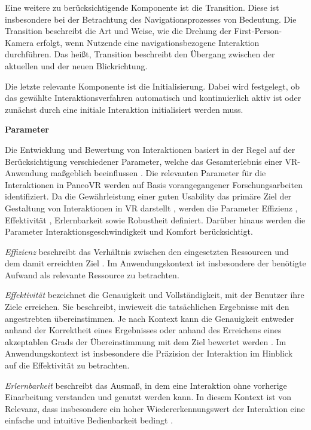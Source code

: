 Eine weitere zu berücksichtigende Komponente ist die Transition. Diese ist insbesondere bei der Betrachtung des Navigationsprozesses von Bedeutung. Die Transition beschreibt die Art und Weise, wie die Drehung der First-Person-Kamera erfolgt, wenn Nutzende eine navigationsbezogene Interaktion durchführen. Das heißt, Transition beschreibt den Übergang zwischen der aktuellen und der neuen Blickrichtung.

Die letzte relevante Komponente ist die Initialisierung. Dabei wird festgelegt, ob das gewählte Interaktionsverfahren automatisch und kontinuierlich aktiv ist oder zunächst durch eine initiale Interaktion initialisiert werden muss. 

{\normalfont \bfseries Parameter} 

Die Entwicklung und Bewertung von Interaktionen basiert in der Regel auf der Berücksichtigung verschiedener Parameter, welche das Gesamterlebnis einer VR-Anwendung maßgeblich beeinflussen \citep{10.1145/3441852.3471230}. Die relevanten Parameter für die Interaktionen in PaneoVR werden auf Basis vorangegangener Forschungsarbeiten identifiziert. Da die Gewährleistung einer guten Usability das primäre Ziel der Gestaltung von Interaktionen in VR darstellt \citep{dorner_virtual_2019}, werden die Parameter Effizienz \citep{DINISO9241-11}, Effektivität \citep{DINISO9241-11}, Erlernbarkeit \citep{DINISO9241-110} sowie Robustheit \citep{DINISO9241-110} definiert. Darüber hinaus werden die Parameter Interaktionsgeschwindigkeit \citep{COOK2015117} und Komfort \citep{jerald_vr_2016} berücksichtigt. 

\textit{Effizienz} beschreibt das Verhältnis zwischen den eingesetzten Ressourcen und dem damit erreichten Ziel \citep{DINISO9241-11}. Im Anwendungskontext ist insbesondere der benötigte Aufwand als relevante Ressource zu betrachten.

\textit{Effektivität} bezeichnet die Genauigkeit und Vollständigkeit, mit der Benutzer ihre Ziele erreichen. Sie beschreibt, inwieweit die tatsächlichen Ergebnisse mit den angestrebten übereinstimmen. Je nach Kontext kann die Genauigkeit entweder anhand der Korrektheit eines Ergebnisses oder anhand des Erreichens eines akzeptablen Grads der Übereinstimmung mit dem Ziel bewertet werden \citep{DINISO9241-11}. Im Anwendungskontext ist insbesondere die Präzision der Interaktion im Hinblick auf die Effektivität zu betrachten. 

\textit{Erlernbarkeit} beschreibt das Ausmaß, in dem eine Interaktion ohne vorherige Einarbeitung verstanden und genutzt werden kann. In diesem Kontext ist von Relevanz, dass insbesondere ein hoher Wiedererkennungswert der Interaktion eine einfache und intuitive Bedienbarkeit bedingt \citep{jerald_vr_2016}.

